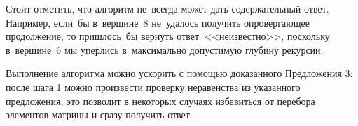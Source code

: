 Стоит отметить, что алгоритм не~всегда может дать содержательный ответ.
Например, если~бы в~вершине~8 не~удалось получить опровергающее продолжение,
то пришлось~бы вернуть ответ~<<неизвестно>>,
поскольку в~вершине~6 мы уперлись в~максимально допустимую глубину рекурсии.

Выполнение алгоритма можно ускорить с помощью доказанного Предложения 3:
после шага 1 можно произвести проверку неравенства из указанного предложения,
это позволит в некоторых случаях избавиться от перебора элементов матрицы и сразу получить ответ.
